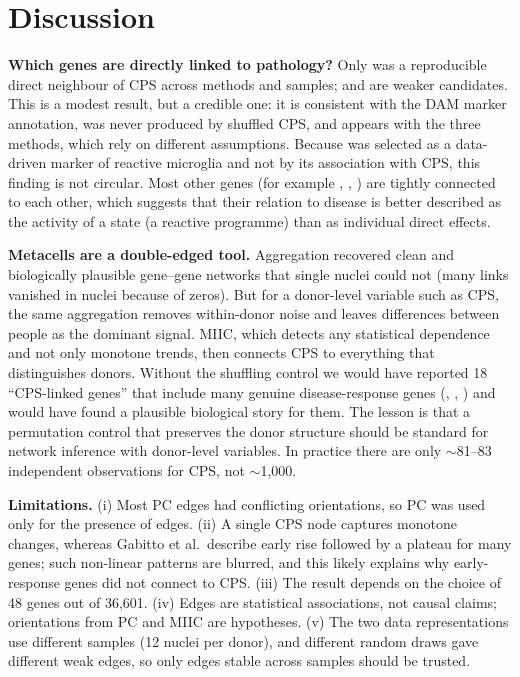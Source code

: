 \section{Discussion}
\textbf{Which genes are directly linked to pathology?} Only  was a reproducible direct neighbour of CPS across methods and samples;  and  are weaker candidates. This is a modest result, but a credible one: it is consistent with the DAM marker annotation, was never produced by shuffled CPS, and appears with the three methods, which rely on different assumptions. Because  was selected as a data-driven marker of reactive microglia and not by its association with CPS, this finding is not circular. Most other genes (for example , , ) are tightly connected to each other, which suggests that their relation to disease is better described as the activity of a state (a reactive programme) than as individual direct effects.

\textbf{Metacells are a double-edged tool.} Aggregation recovered clean and biologically plausible gene--gene networks that single nuclei could not (many links vanished in nuclei because of zeros). But for a donor-level variable such as CPS, the same aggregation removes within-donor noise and leaves differences between people as the dominant signal. MIIC, which detects any statistical dependence and not only monotone trends, then connects CPS to everything that distinguishes donors. Without the shuffling control we would have reported 18 ``CPS-linked genes'' that include many genuine disease-response genes (, , ) and would have found a plausible biological story for them. The lesson is that a permutation control that preserves the donor structure should be standard for network inference with donor-level variables. In practice there are only $\sim$81--83 independent observations for CPS, not $\sim$1{,}000.

\textbf{Limitations.} (i) Most PC edges had conflicting orientations, so PC was used only for the presence of edges. (ii) A single CPS node captures monotone changes, whereas Gabitto et al.\ describe early rise followed by a plateau for many genes; such non-linear patterns are blurred, and this likely explains why early-response genes did not connect to CPS. (iii) The result depends on the choice of 48 genes out of 36{,}601. (iv) Edges are statistical associations, not causal claims; orientations from PC and MIIC are hypotheses. (v) The two data representations use different samples (12 nuclei per donor), and different random draws gave different weak edges, so only edges stable across samples should be trusted.

